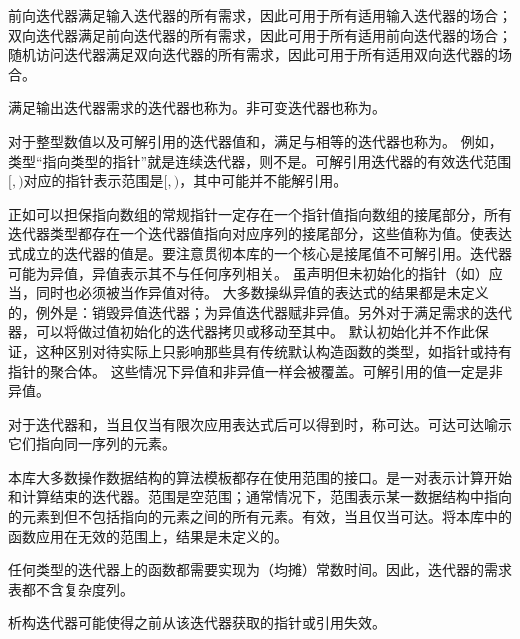 \pnum
前向迭代器满足输入迭代器的所有需求，因此可用于所有适用输入迭代器的场合；双向迭代器满足前向迭代器的所有需求，因此可用于所有适用前向迭代器的场合；随机访问迭代器满足双向迭代器的所有需求，因此可用于所有适用双向迭代器的场合。

\pnum
满足输出迭代器需求的迭代器也称为。非可变迭代器也称为。

\pnum
对于整型数值以及可解引用的迭代器值和，满足与相等的迭代器也称为。
\enternote
例如，类型“指向类型的指针”就是连续迭代器，则不是。可解引用迭代器的有效迭代范围$[$$, $$)$对应的指针表示范围是$[$$, $$)$，其中可能并不能解引用。
\exitnote

\pnum
正如可以担保指向数组的常规指针一定存在一个指针值指向数组的接尾部分，所有迭代器类型都存在一个迭代器值指向对应序列的接尾部分，这些值称为值。使表达式成立的迭代器的值是。要注意贯彻本库的一个核心是接尾值不可解引用。迭代器可能为异值，异值表示其不与任何序列相关。
\enterexample
虽声明但未初始化的指针（如）应当，同时也必须被当作异值对待。
\exitexample
大多数操纵异值的表达式的结果都是未定义的，例外是：销毁异值迭代器；为异值迭代器赋非异值。另外对于满足需求的迭代器，可以将做过值初始化的迭代器拷贝或移动至其中。
\enternote
默认初始化并不作此保证，这种区别对待实际上只影响那些具有传统默认构造函数的类型，如指针或持有指针的聚合体。
\exitnote
这些情况下异值和非异值一样会被覆盖。可解引用的值一定是非异值。

\pnum
对于迭代器和，当且仅当有限次应用表达式后可以得到时，称可达。可达可达喻示它们指向同一序列的元素。

\pnum
本库大多数操作数据结构的算法模板都存在使用范围的接口。是一对表示计算开始和计算结束的迭代器。范围是空范围；通常情况下，范围表示某一数据结构中指向的元素到但不包括指向的元素之间的所有元素。有效，当且仅当可达。将本库中的函数应用在无效的范围上，结果是未定义的。

\pnum
任何类型的迭代器上的函数都需要实现为（均摊）常数时间。因此，迭代器的需求表都不含复杂度列。

\pnum
析构迭代器可能使得之前从该迭代器获取的指针或引用失效。

